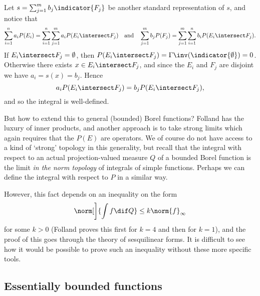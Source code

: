\documentclass[article, a4paper, 11pt, oneside]{memoir}
\numberwithin{equation}{chapter}
\begin{document}
\begin{remark}
    Let $s = \sum_{j=1}^m b_j \indicator{F_j}$ be another standard representation of $s$, and notice that
    \begin{equation*}
        \sum_{i=1}^n a_i P(E_i)
            = \sum_{i=1}^n \sum_{j=1}^m a_i P(E_i \intersect F_j)
        \quad \text{and} \quad
        \sum_{j=1}^m b_j P(F_j)
            = \sum_{j=1}^m \sum_{i=1}^n b_i P(E_i \intersect F_j).
    \end{equation*}
    If $E_i \intersect F_j = \emptyset$, then $P(E_i \intersect F_j) = \Gamma\inv(\indicator{\emptyset}) = 0$. Otherwise there exists $x \in E_i \intersect F_j$, and since the $E_i$ and $F_j$ are disjoint we have $a_i = s(x) = b_j$. Hence
    \begin{equation*}
            a_i P(E_i \intersect F_j)
                = b_j P(E_i \intersect F_j),
    \end{equation*}
    and so the integral is well-defined.

    But how to extend this to general (bounded) Borel functions? Folland has the luxury of inner products, and another approach is to take strong limits which again requires that the $P(E)$ are operators. We of course do not have access to a kind of `strong' topology in this generality, but recall that the integral with respect to an actual projection-valued measure $Q$ of a bounded Borel function is the limit \emph{in the norm topology} of integrals of simple functions. Perhaps we can define the integral with respect to $P$ in a similar way.

    However, this fact depends on an inequality on the form
    \begin{equation*}
        \norm[\bigg]{ \int f \dif Q }
            \leq k \norm{f}_\infty
    \end{equation*}
    for some $k > 0$ (Folland proves this first for $k = 4$ and then for $k = 1$), and the proof of this goes through the theory of sesquilinear forms. It is difficult to see how it would be possible to prove such an inequality without these more specific tools.
\end{remark}


\subsection{Essentially bounded functions}

\newcommand{\meas}[1]{\mathcal{M}(#1)}
\newcommand{\essran}{\operatorname{im}_\infty}
\end{document}
